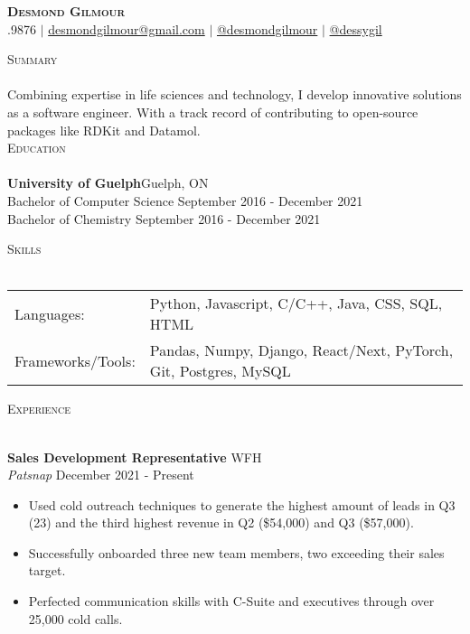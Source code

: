 \documentclass[a4paper]{article}
\newcommand{\lineunder} {
    \vspace*{-8pt} \\
    \hspace*{-18pt} \hrulefill \\
}
\newcommand{\header} [1] {
    {\hspace*{-18pt}\vspace*{6pt} \textsc{#1}}
    \vspace*{-6pt} \lineunder
}
\begin{document}
\vspace*{-40pt}

    

\vspace*{-10pt}
\begin{center}

	\textbf{{\Huge \scshape {Desmond Gilmour}}}\\
	\faPhone{}.9876 $|$ 
        \faEnvelope\space\href{mailto:desmondgilmour@gmail.com}{desmondgilmour@gmail.com} $|$  
        \faLinkedinSquare\space\href{https://www.linkedin.com/in/desmond-gilmour-886b3a128/}{@desmondgilmour} $|$
        \faGithubSquare\space\href{https://github.com/dessygil}{@dessygil}
        \\
\end{center}

\header {Summary}
Combining expertise in life sciences and technology, I develop innovative solutions as a software engineer. With a track record of contributing to open-source packages like RDKit and Datamol.
\\

\header{Education}
\textbf{University of Guelph}\hfill Guelph, ON\\
Bachelor of Computer Science \hfill September 2016 - December 2021\\
Bachelor of Chemistry \hfill September 2016 - December 2021\\
\vspace{2mm}

\header{Skills}
\begin{tabular}{ l l }
	Languages:        & Python, Javascript, C/C++, Java, CSS, SQL, HTML                      \\
	Frameworks/Tools: & Pandas, Numpy, Django, React/Next, PyTorch, Git, Postgres, MySQL  \\
\end{tabular}
\vspace{2mm}

\header{Experience}
\vspace{1mm}

\textbf{Sales Development Representative} \hfill WFH\\
\textit{Patsnap} \hfill December 2021 - Present\\
\vspace{-1mm}
\begin{itemize} \itemsep 1pt
	\item Used cold outreach techniques to generate the highest amount of leads in Q3 (23) and the third highest revenue in Q2 (\$54,000) and Q3 (\$57,000).
	\item Successfully onboarded three new team members, two exceeding their sales target.
	\item Perfected communication skills with C-Suite and executives through over 25,000 cold calls.
\end{itemize}
\end{document}
